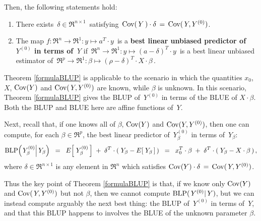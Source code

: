 \begin{theorem}
Then, the following statements hold:
\begin{enumerate}
\item
	There exists \,$\delta \in \Re^{n \times 1}$\, satisfying \,$\textnormal{Cov}(\,Y\,) \cdot \delta \,=\, \textnormal{Cov}(\,Y,Y^{(0)})$.
\item
	The map $f : \Re^{n} \longrightarrow \Re^{1} : y \longmapsto a^{T} \cdot y$\,
	is a \textbf{\color{red}best linear unbiased predictor of \,$Y^{(0)}$ in terms of \,$Y$} if
	\,$\Re^{n} \longrightarrow \Re^{1} : y \longmapsto (a - \delta)^{T} \cdot y$\,
	is a best linear unbiased estimator of 
	\,$\Re^{p} \longrightarrow \Re^{1} : \beta \longmapsto (\rho - \delta)^{T} \cdot X \cdot \beta$\,.
\end{enumerate}
\end{theorem}

\begin{remark}
\mbox{}
\vskip 0.05cm
\noindent
Theorem \ref{formulaBLUP} is applicable to the scenario in which
the quantities $x_{0}$, $X$, $\textnormal{Cov}(Y)$ and $\textnormal{Cov}(\,Y,Y^{(0)})$ are {\color{red}known}, while
{\color{red}$\beta$ is unknown}.
In this scenario, Theorem \ref{formulaBLUP} gives the BLUP of
\,$Y^{(0)}$ in terms of the BLUE of $X\cdot\beta$.
Both the BLUP and BLUE here are affine functions of \,$Y$.

Next, recall that, if one knows all of $\beta$, $\textnormal{Cov}(Y)$ and $\textnormal{Cov}(Y,Y^{(0)})$,
then one can compute, for each $\beta\in\Re^{p}$,
the {\color{red}best linear predictor of \,$Y^{(0)}_{\beta}$ in terms of \,$Y_{\beta}$}:
\begin{equation*}
\textnormal{BLP}\!\left(\left.Y^{(0)}_{\beta}\right\vert Y_{\beta}\right)
\;\; = \;\;
	E\!\left[\;Y^{(0)}_{\beta}\,\right] \; + \; \delta^{T}\cdot(\;Y_{\beta} - E\!\left[\;Y_{\beta}\,\right]\,)
\;\; = \;\;
	x_{0}^{T}\cdot\beta \; + \; \delta^{T}\cdot(\;Y_{\beta} - X\cdot\beta\,)\,,
\end{equation*}
where $\delta \in \Re^{n \times 1}$ is any element in $\Re^{n}$ which satisfies
$\textnormal{Cov}(Y) \cdot \delta \,=\, \textnormal{Cov}(\,Y,Y^{(0)})$.

Thus the key point of Theorem \ref{formulaBLUP} is that,
if we know only $\textnormal{Cov}(Y)$ and $\textnormal{Cov}(\,Y,Y^{(0)})$ but not $\beta$, then we cannot
compute $\textnormal{BLP}(\,Y^{(0)}\vert\,Y)$, but we can instead compute arguably the next best thing:
the BLUP of \,$Y^{(0)}$ in terms of \,$Y$, and that this BLUP happens to involves
the BLUE of the unknown parameter $\beta$.
\end{remark}

